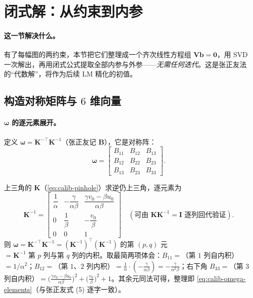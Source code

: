 \section{闭式解：从约束到内参}
\label{sec:calib-closed}

\paragraph{这一节解决什么。}
有了每幅图的两约束，本节把它们整理成一个齐次线性方程组 $\mathbf{V}\mathbf{b}=\mathbf{0}$，用 SVD 一次解出，再用闭式公式提取全部内参与外参——\emph{无需任何迭代}。这是张正友法的“代数解”，将作为后续 LM 精化的初值。

\subsection{构造对称矩阵与 $6$ 维向量}
\label{sec:calib-b-vector}

\paragraph{$\boldsymbol{\omega}$ 的逐元素展开。}
定义 $\boldsymbol{\omega}=\mathbf{K}^{-\top}\mathbf{K}^{-1}$（张正友记 $\mathbf{B}$），它是对称阵：
\begin{equation}
  \boldsymbol{\omega}=\begin{bmatrix} B_{11}&B_{12}&B_{13}\\ B_{12}&B_{22}&B_{23}\\ B_{13}&B_{23}&B_{33}\end{bmatrix}.
\end{equation}

\begin{derivation}
上三角的 $\mathbf{K}$（\cref{eq:calib-pinhole}）求逆仍上三角，逐元素为
\[
  \mathbf{K}^{-1}=\begin{bmatrix}
  \dfrac{1}{\alpha} & -\dfrac{\gamma}{\alpha\beta} & \dfrac{\gamma v_0-\beta u_0}{\alpha\beta}\\[1.6ex]
  0 & \dfrac{1}{\beta} & -\dfrac{v_0}{\beta}\\[1.2ex]
  0 & 0 & 1
  \end{bmatrix}
  \quad(\text{可由 }\mathbf{K}\mathbf{K}^{-1}=\mathbf{I}\text{ 逐列回代验证}).
\]
则 $\boldsymbol{\omega}=\mathbf{K}^{-\top}\mathbf{K}^{-1}=(\mathbf{K}^{-1})^\top(\mathbf{K}^{-1})$ 的第 $(p,q)$ 元 $=\mathbf{K}^{-1}\text{ 第 }p\text{ 列与第 }q\text{ 列的内积}$。取最简两项体会：$B_{11}=$（第 $1$ 列自内积）$=1/\alpha^2$；$B_{12}=$（第 $1$、$2$ 列内积）$=\tfrac{1}{\alpha}\cdot(-\tfrac{\gamma}{\alpha\beta})=-\tfrac{\gamma}{\alpha^2\beta}$；右下角 $B_{33}=$（第 $3$ 列自内积）$=\big(\tfrac{\gamma v_0-\beta u_0}{\alpha\beta}\big)^2+\big(\tfrac{v_0}{\beta}\big)^2+1$。其余元同法可得，整理即 \cref{eq:calib-omega-elements}（与张正友式 (5) 逐字一致）。
\end{derivation}

